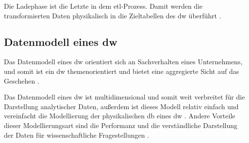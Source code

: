 Die Ladephase ist die Letzte in dem \ac{etl}-Prozess. Damit werden die transformierten Daten physikalisch in die Zieltabellen des \ac{dw} überführt \cite{dwgoeken, dwtool}.

\subsection{Datenmodell eines \acs{dw}} \label{subsec:datamodel}

Das Datenmodell eines \ac{dw} orientiert sich an Sachverhalten eines Unternehmens, und somit ist ein \ac{dw} themenorientiert und bietet eine aggregierte Sicht auf das Geschehen \cite{dwgoeken}.

Das Datenmodell eines \ac{dw} ist multidimensional und somit weit verbreitet für die Darstellung analytischer Daten, außerdem ist dieses Modell relativ einfach und vereinfacht die Modellierung der physikalischen \ac{db} eines \ac{dw} \cite{dwbauer}. Andere Vorteile dieser Modellierungsart sind die Performanz und die verständliche Darstellung der Daten für wissenschaftliche Fragestellungen \cite{dwtool}.

